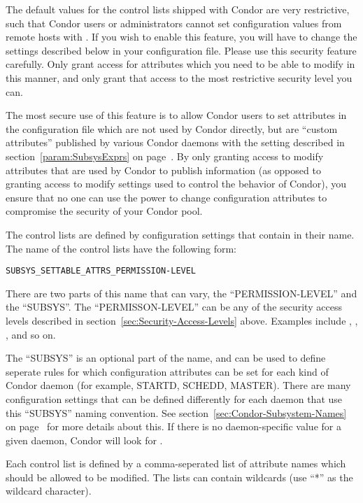 The default values for the control lists  shipped with Condor are very
restrictive, such that Condor users or administrators cannot set
configuration values from remote hosts with .
If you wish to enable this feature, you will have to change the
settings described below in your configuration file.
Please use this security feature carefully.
Only grant access for attributes which you need to be able to modify
in this manner, and only grant that access to the most restrictive
security level you can.

The most secure use of this feature is to allow Condor users to set
attributes in the configuration file which are not used by Condor
directly, but are ``custom attributes'' published by various Condor
daemons with the  setting described in
section~\ref{param:SubsysExprs} on page~\pageref{param:SubsysExprs}.
By only granting access to modify attributes that are used by Condor
to publish information (as opposed to granting access to modify
settings used to control the behavior of Condor), you ensure that no
one can use the power to change configuration attributes to compromise 
the security of your Condor pool.

The control lists are defined by configuration settings that contain 
 in their name.
The name of the control lists have the following form: 

\begin{verbatim}
SUBSYS_SETTABLE_ATTRS_PERMISSION-LEVEL
\end{verbatim}

There are two parts of this name that can vary, the
``PERMISSION-LEVEL'' and the ``SUBSYS''.
The ``PERMISSON-LEVEL'' can be any of the security access levels
described in section~\ref{sec:Security-Access-Levels} above.
Examples include , , , and
so on.

The ``SUBSYS'' is an optional part of the name, and can be used to
define seperate rules for which configuration attributes can be set
for each kind of Condor daemon (for example, STARTD, SCHEDD, MASTER).
There are many configuration settings that can be defined differently
for each daemon that use this ``SUBSYS'' naming convention.
See section~\ref{sec:Condor-Subsystem-Names} on
page~\pageref{sec:Condor-Subsystem-Names} for more details about
this.  
If there is no daemon-specific value for a given daemon, Condor will
look for .

Each control list is defined by a comma-seperated list of attribute
names which should be allowed to be modified.
The lists can contain wildcards (use ``*'' as the wildcard
character). 

